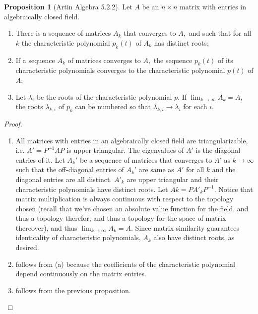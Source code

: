 \documentclass[10pt]{report}
\theoremstyle{definition}
\newtheorem{proposition}{Proposition}
\begin{document}
\begin{proposition}[Artin Algebra 5.2.2]
Let $A$ be an $n\times n$ matrix with entries in algebraically closed field.
\begin{enumerate}
\item
There is a sequence of matrices $A_{k}$ that converges to $A,$ and such that for all $k$ the characteristic polynomial $p_{k}(t)$ of $A_{k}$ has distinct roots;
\item
If a sequence $A_{k}$ of matrices converges to $A,$ the sequence $p_{k}(t)$ of its characteristic polynomials converges to the characteristic polynomial $p(t)$ of $A$;
\item
Let $\lambda_{i}$ be the roots of the characteristic polynomial $p .$ If $\lim_{k\to\infty}A_k=A$, the roots $\lambda_{k, i}$ of $p_{k}$ can be numbered so that $\lambda_{k, i} \rightarrow \lambda_{i}$ for each $i$.
\end{enumerate}
\end{proposition}
\begin{proof}{}\leavevmode{}
\begin{enumerate}
\item
All matrices with entries in an algebraically closed field are triangularizable, i.e. $A'=P^{-1}AP$ is upper triangular. The eigenvalues of $A'$ is the diagonal entries of it. Let $A_k'$ be a sequence of matrices that converges to $A'$ as $k\to\infty$ such that the off-diagonal entries of $A_k'$ are same as $A'$ for all $k$ and the diagonal entries are all distinct. $A'_k$ are upper triangular and their characteristic polynomials have distinct roots. Let $Ak=PA'_kP^{-1}$. Notice that matrix multiplication is always continuous with respect to the topology chosen (recall that we've chosen an absolute value function for the field, and thus a topology therefor, and thus a topology for the space of matrix thereover), and thus $\lim_{k\to\infty}A_k=A$. Since matrix similarity guarantees identicality of characteristic polynomials, $A_k$ also have distinct roots, as desired.
\item
follows from (a) because the coefficients of the characteristic polynomial depend continuously on the matrix entries.
\item
follows from the previous proposition.
\end{enumerate}
\end{proof}
\end{document}
